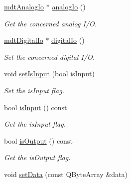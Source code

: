 \begin{DoxyCompactItemize}
\hyperlink{classmdt_analog_io}{mdtAnalogIo} $\ast$ \hyperlink{classmdt_port_transaction_a59409e826441bcff560ea3e44b885d64}{analogIo} ()
\begin{DoxyCompactList}\small\item\em Get the concerned analog I/O. \end{DoxyCompactList}\item 
\hyperlink{classmdt_digital_io}{mdtDigitalIo} $\ast$ \hyperlink{classmdt_port_transaction_a0515e5ded32eb76047586fdb6274d3eb}{digitalIo} ()
\begin{DoxyCompactList}\small\item\em Set the concerned digital I/O. \end{DoxyCompactList}\item 
\hypertarget{classmdt_port_transaction_ad49afb93f44aca47ded0e03018f8266f}{
void \hyperlink{classmdt_port_transaction_ad49afb93f44aca47ded0e03018f8266f}{setIsInput} (bool isInput)}
\label{classmdt_port_transaction_ad49afb93f44aca47ded0e03018f8266f}

\begin{DoxyCompactList}\small\item\em Set the isInput flag. \end{DoxyCompactList}\item 
\hypertarget{classmdt_port_transaction_a2aaf0f003556d7f93ec2d3846589673d}{
bool \hyperlink{classmdt_port_transaction_a2aaf0f003556d7f93ec2d3846589673d}{isInput} () const }
\label{classmdt_port_transaction_a2aaf0f003556d7f93ec2d3846589673d}

\begin{DoxyCompactList}\small\item\em Get the isInput flag. \end{DoxyCompactList}\item 
\hypertarget{classmdt_port_transaction_af628e8888c15525777504111a687b6a0}{
bool \hyperlink{classmdt_port_transaction_af628e8888c15525777504111a687b6a0}{isOutput} () const }
\label{classmdt_port_transaction_af628e8888c15525777504111a687b6a0}

\begin{DoxyCompactList}\small\item\em Get the isOutput flag. \end{DoxyCompactList}\item 
\hypertarget{classmdt_port_transaction_a9487e13f95c553cead6e2043573615d9}{
void \hyperlink{classmdt_port_transaction_a9487e13f95c553cead6e2043573615d9}{setData} (const QByteArray \&data)}
\label{classmdt_port_transaction_a9487e13f95c553cead6e2043573615d9}


\end{DoxyCompactItemize}
